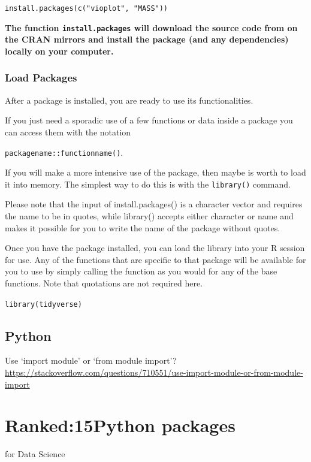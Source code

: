 \documentclass[]{book}
\begin{document}
\texttt{install.packages(c("vioplot",\ "MASS"))}

\textbf{The function \texttt{install.packages} will download the source code from on the CRAN mirrors and install the package (and any dependencies) locally on your computer.}

\hypertarget{load-packages}{%
\subsubsection{Load Packages}\label{load-packages}}

After a package is installed, you are ready to use its functionalities.

If you just need a sporadic use of a few functions or data inside a package you can access them with the notation

\texttt{packagename::functionname()}.

If you will make a more intensive use of the package, then maybe is worth to load it into memory. The simplest way to do this is with the \texttt{library()} command.

Please note that the input of install.packages() is a character vector and requires the name to be in quotes, while library() accepts either character or name and makes it possible for you to write the name of the package without quotes.

Once you have the package installed, you can load the library into your R session for use. Any of the functions that are specific to that package will be available for you to use by simply calling the function as you would for any of the base functions. Note that quotations are not required here.

\texttt{library(tidyverse)}

\hypertarget{python-4}{%
\subsection{Python}\label{python-4}}

Use `import module' or `from module import'? \url{https://stackoverflow.com/questions/710551/use-import-module-or-from-module-import}

\hypertarget{ranked15python-packages}{%
\section{Ranked:15Python packages}\label{ranked15python-packages}}

for Data Science
\end{document}
